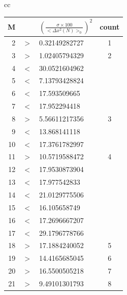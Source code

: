 \documentclass{jsarticle}
\begin{document}
\begin{enumerate}
\begin{enumerate}
\begin{table}[H]
\begin{center}
\begin{tabular}{cc}
                                \begin{minipage}{0.5\hsize}
                                    \begin{center}
                                    \begin{tabular}{rcl|c}
                                        M &     & $\left( \frac{\sigma\times 100}{< \Delta x^{2}(N)>_{0}}\right) ^{2}$ & count \\ \hline
                                        2 & $>$ & 0.32149282727 & 1 \\
                                        3 & $>$ & 1.02405794329 & 2 \\
                                        4 & $<$ & 30.0521604962 & \\
                                        5 & $<$ & 7.13793428824 & \\
                                        6 & $<$ & 17.593509665 & \\
                                        7 & $<$ & 17.952294418 & \\
                                        8 & $>$ & 5.56611217356 & 3 \\
                                        9 & $<$ & 13.868141118 & \\
                                        10 & $<$ & 17.3761782997 & \\
                                        11 & $>$ & 10.5719588472 & 4 \\
                                        12 & $<$ & 17.9530873904 & \\
                                        13 & $<$ & 17.977542833 & \\
                                        14 & $<$ & 21.0129775506 & \\
                                        15 & $<$ & 16.105658749 & \\
                                        16 & $<$ & 17.2696667207 & \\
                                        17 & $<$ & 29.1796778766 & \\
                                        18 & $>$ & 17.1884240052 & 5 \\
                                        19 & $>$ & 14.4165685045 & 6 \\
                                        20 & $>$ & 16.5500505218 & 7 \\
                                        21 & $>$ & 9.49101301793 & 8 \\

\end{tabular}
\end{center}
\end{minipage}
\end{tabular}
\end{center}
\end{table}
\end{enumerate}
\end{enumerate}
\end{document}

